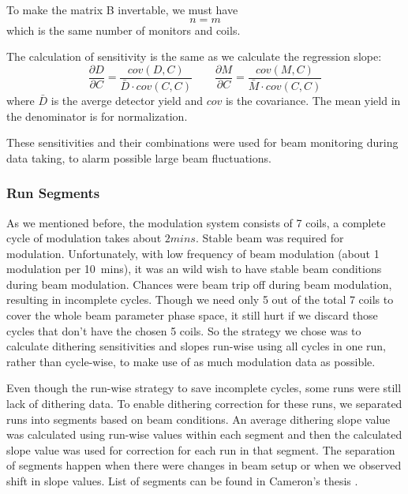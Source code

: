 To make the matrix B invertable, we must have
\begin{equation}
    n = m
\end{equation}
which is the same number of monitors and coils.

The calculation of sensitivity is the same as we calculate the regression slope:
\begin{equation}
    \frac{\partial D}{\partial C} = \frac{cov(D, C)}{\bar{D} \cdot cov(C, C)}
    \qquad
    \frac{\partial M}{\partial C} = \frac{cov(M, C)}{\bar{M} \cdot cov(C, C)}
\end{equation}
where $\bar{D}$ is the averge detector yield and $cov$ is the covariance. The
mean yield in the denominator is for normalization. 

These sensitivities and their combinations were used for beam monitoring during
data taking, to alarm possible large beam fluctuations.

\subsubsection{Run Segments}
As we mentioned before, the modulation system consists of 7 coils, a complete 
cycle of modulation takes about $2 mins$. Stable beam was required for modulation.
Unfortunately, with low frequency of beam modulation (about 1 modulation per 10~mins), 
it was an wild wish to have stable beam conditions during beam modulation. Chances were
beam trip off during beam modulation, resulting in incomplete cycles. Though we
need only 5 out of the total 7 coils to cover the whole beam parameter phase space,
it still hurt if we discard those cycles that don't have the chosen 5 coils. So
the strategy we chose was to calculate dithering sensitivities and slopes run-wise
using all cycles in one run, rather than cycle-wise, to make use of 
as much modulation data as possible.

Even though the run-wise strategy to save incomplete cycles, some runs were still
lack of dithering data. To enable dithering correction for these runs, we separated
runs into segments based on beam conditions. An average dithering slope value
was calculated using run-wise values within each segment and then the calculated
slope value was used for correction for each run in that segment. The separation
of segments happen when there were changes in beam setup or when we observed shift
in slope values. List of segments can be found in Cameron's thesis \cite{Cameron_thesis}.

